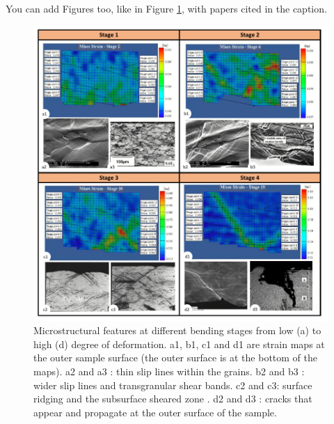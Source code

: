 \vspace{0.1 in}
\noindent
You can add Figures too, like in Figure \ref{fig:stages}, with papers cited in the caption.

\begin{figure}[H] %
    \centering
    \includegraphics[width=5.5in]{Figures/LitRev/microstructural-features.pdf}
    \caption{Microstructural features at different bending stages from low (a) to high (d) degree of deformation. a1, b1, c1 and d1 are strain maps at the outer sample surface \cite{DAVIDKOV2012} (the outer surface is at the bottom of the maps). a2 \cite{DAVIDKOV2011} and a3 \cite{MATTEI2013}: thin slip lines within the grains. b2 \cite{DAVIDKOV2011} and b3 \cite{MATTEI2013}: wider slip lines and transgranular shear bands. c2 and c3: surface ridging and the subsurface sheared zone \cite{dao2001}. d2 \cite{DAVIDKOV2012} and d3 \cite{DAVIDKOV2011}: cracks that appear and propagate at the outer surface of the sample.}
    \label{fig:stages}
\end{figure}
